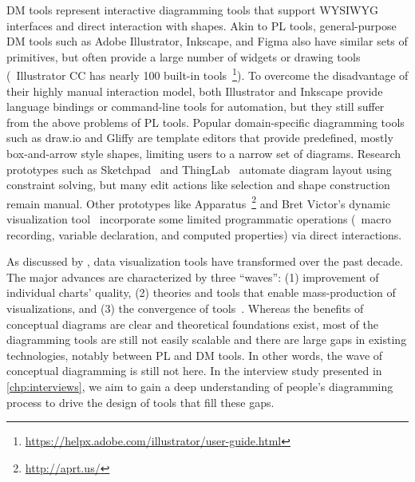 DM tools represent interactive diagramming tools that support WYSIWYG interfaces and direct interaction with shapes. Akin to PL tools, general-purpose DM tools such as Adobe Illustrator, Inkscape, and Figma also have similar sets of primitives, but often provide a large number of widgets or drawing tools (\eg~Illustrator CC has nearly 100 built-in tools~\footnote{\url{https://helpx.adobe.com/illustrator/user-guide.html}}). To overcome the disadvantage of their highly manual interaction model, both Illustrator and Inkscape provide language bindings or command-line tools for automation, but they still suffer from the above problems of PL tools. Popular domain-specific diagramming tools such as draw.io and Gliffy are template editors that provide predefined, mostly box-and-arrow style shapes, limiting users to a narrow set of diagrams. Research prototypes such as Sketchpad~\cite{sketchpad} and ThingLab~\cite{thinglab} automate diagram layout using constraint solving, but many edit actions like selection and shape construction remain manual. Other prototypes like Apparatus~\footnote{\url{http://aprt.us/}} and Bret Victor's dynamic visualization tool~\cite{dynamicViz} incorporate some limited programmatic operations (\eg~macro recording, variable declaration, and computed properties) via direct interactions. 

As discussed by \citet{satyanarayan_critical_2020}, data visualization tools have transformed over the past decade. The major advances are characterized by three ``waves'': (1) improvement of individual charts' quality, (2) theories and tools that enable mass-production of visualizations, and (3) the convergence of tools~\cite{thirdWaveViz}. Whereas the benefits of conceptual diagrams are clear and theoretical foundations exist, most of the diagramming tools are still not easily scalable and there are large gaps in existing technologies, notably between PL and DM tools. In other words, the  wave of conceptual diagramming is still not here. In the interview study presented in \cref{chp:interviews}, we aim to gain a deep understanding of people's diagramming process to drive the design of tools that fill these gaps.




